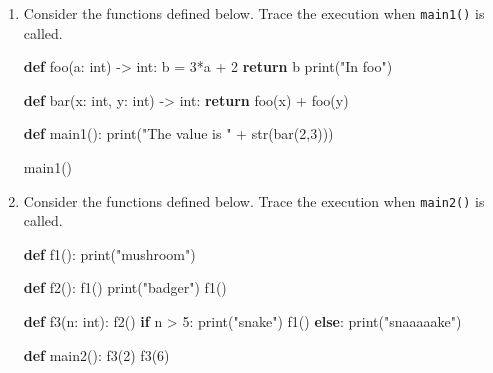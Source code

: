 \documentclass[]{article}
\newenvironment{Shaded}{}{}
\newcommand{\KeywordTok}[1]{\textcolor[rgb]{0.00,0.44,0.13}{\textbf{#1}}}
\newcommand{\DecValTok}[1]{\textcolor[rgb]{0.25,0.63,0.44}{#1}}
\newcommand{\StringTok}[1]{\textcolor[rgb]{0.25,0.44,0.63}{#1}}
\newcommand{\ControlFlowTok}[1]{\textcolor[rgb]{0.00,0.44,0.13}{\textbf{#1}}}
\newcommand{\OperatorTok}[1]{\textcolor[rgb]{0.40,0.40,0.40}{#1}}
\newcommand{\BuiltInTok}[1]{#1}
\newcommand{\NormalTok}[1]{#1}
\begin{document}
\begin{enumerate}
\def\labelenumi{\arabic{enumi}.}
\item
  Consider the functions defined below. Trace the execution when
  \texttt{main1()} is called.

\begin{Shaded}
\begin{Highlighting}[]
\KeywordTok{def}\NormalTok{ foo(a: }\BuiltInTok{int}\NormalTok{) }\OperatorTok{->} \BuiltInTok{int}\NormalTok{:}
\NormalTok{    b }\OperatorTok{=} \DecValTok{3}\OperatorTok{*}\NormalTok{a }\OperatorTok{+} \DecValTok{2}
    \ControlFlowTok{return}\NormalTok{ b}
    \BuiltInTok{print}\NormalTok{(}\StringTok{"In foo"}\NormalTok{)}

\KeywordTok{def}\NormalTok{ bar(x: }\BuiltInTok{int}\NormalTok{, y: }\BuiltInTok{int}\NormalTok{) }\OperatorTok{->} \BuiltInTok{int}\NormalTok{:}
    \ControlFlowTok{return}\NormalTok{ foo(x) }\OperatorTok{+}\NormalTok{ foo(y)}

\KeywordTok{def}\NormalTok{ main1():}
    \BuiltInTok{print}\NormalTok{(}\StringTok{"The value is "} \OperatorTok{+} \BuiltInTok{str}\NormalTok{(bar(}\DecValTok{2}\NormalTok{,}\DecValTok{3}\NormalTok{)))}

\NormalTok{main1()}
\end{Highlighting}
\end{Shaded}
\item
  Consider the functions defined below. Trace the execution when
  \texttt{main2()} is called.

\begin{Shaded}
\begin{Highlighting}[]
\KeywordTok{def}\NormalTok{ f1():}
    \BuiltInTok{print}\NormalTok{(}\StringTok{"mushroom"}\NormalTok{)}

\KeywordTok{def}\NormalTok{ f2():}
\NormalTok{    f1()}
    \BuiltInTok{print}\NormalTok{(}\StringTok{"badger"}\NormalTok{)}
\NormalTok{    f1()}

\KeywordTok{def}\NormalTok{ f3(n: }\BuiltInTok{int}\NormalTok{):}
\NormalTok{    f2()}
    \ControlFlowTok{if}\NormalTok{ n }\OperatorTok{>} \DecValTok{5}\NormalTok{:}
        \BuiltInTok{print}\NormalTok{(}\StringTok{"snake"}\NormalTok{)}
\NormalTok{        f1()}
    \ControlFlowTok{else}\NormalTok{:}
        \BuiltInTok{print}\NormalTok{(}\StringTok{"snaaaaake"}\NormalTok{)}

\KeywordTok{def}\NormalTok{ main2():}
\NormalTok{    f3(}\DecValTok{2}\NormalTok{)}
\NormalTok{    f3(}\DecValTok{6}\NormalTok{)}


\end{Highlighting}
\end{Shaded}
\end{enumerate}
\end{document}
